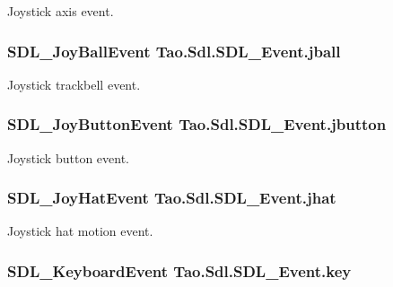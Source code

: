 Joystick axis event. 

\hypertarget{struct_tao_1_1_sdl_1_1_s_d_l___event_a97ae230b63c80c1e12dc7ce6d3b1048f}{
\subsubsection[{jball}]{\setlength{\rightskip}{0pt plus 5cm}SDL\_\-JoyBallEvent {\bf Tao.Sdl.SDL\_\-Event.jball}}}
\label{struct_tao_1_1_sdl_1_1_s_d_l___event_a97ae230b63c80c1e12dc7ce6d3b1048f}


Joystick trackbell event. 

\hypertarget{struct_tao_1_1_sdl_1_1_s_d_l___event_a525a01d671ad3cbf9750ad52be47f251}{
\subsubsection[{jbutton}]{\setlength{\rightskip}{0pt plus 5cm}SDL\_\-JoyButtonEvent {\bf Tao.Sdl.SDL\_\-Event.jbutton}}}
\label{struct_tao_1_1_sdl_1_1_s_d_l___event_a525a01d671ad3cbf9750ad52be47f251}


Joystick button event. 

\hypertarget{struct_tao_1_1_sdl_1_1_s_d_l___event_a66d412f4b5a22e1a2a6c2f095bd8ff77}{
\subsubsection[{jhat}]{\setlength{\rightskip}{0pt plus 5cm}SDL\_\-JoyHatEvent {\bf Tao.Sdl.SDL\_\-Event.jhat}}}
\label{struct_tao_1_1_sdl_1_1_s_d_l___event_a66d412f4b5a22e1a2a6c2f095bd8ff77}


Joystick hat motion event. 

\hypertarget{struct_tao_1_1_sdl_1_1_s_d_l___event_a498e1a2f220554305afec46e16701f35}{
\subsubsection[{key}]{\setlength{\rightskip}{0pt plus 5cm}SDL\_\-KeyboardEvent {\bf Tao.Sdl.SDL\_\-Event.key}}}
\label{struct_tao_1_1_sdl_1_1_s_d_l___event_a498e1a2f220554305afec46e16701f35}


